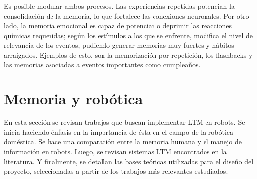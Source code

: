 Es posible modular ambos procesos. Las experiencias repetidas potencian la consolidación de la memoria, lo que fortalece las conexiones neuronales. Por otro lado, la memoria emocional es capaz de potenciar o deprimir las reacciones químicas requeridas; según los estímulos a los que se enfrente, modifica el nivel de relevancia de los eventos, pudiendo generar memorias muy fuertes y hábitos arraigados. Ejemplos de esto, son la memorización por repetición, los flashbacks y las memorias asociadas a eventos importantes como cumpleaños.









\section{Memoria y robótica}\label{sec:robotic_memory}

En esta sección se revisan trabajos que buscan implementar LTM en robots. Se inicia haciendo énfasis en la importancia de ésta en el campo de la robótica doméstica. Se hace una comparación entre la memoria humana y el manejo de información en robots. Luego, se revisan sistemas LTM encontrados en la literatura. Y finalmente, se detallan las bases teóricas utilizadas para el diseño del proyecto, seleccionadas a partir de los trabajos más relevantes estudiados.


